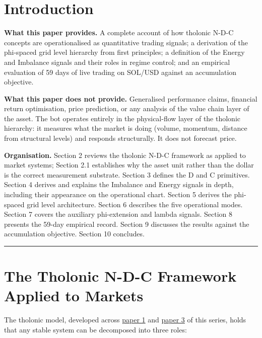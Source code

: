 \documentclass[12pt]{article}
\begin{document}
\section{Introduction}\label{introduction}

\textbf{What this paper provides.} A complete account of how tholonic
N-D-C concepts are operationalised as quantitative trading signals; a
derivation of the phi-spaced grid level hierarchy from first principles;
a definition of the Energy and Imbalance signals and their roles in
regime control; and an empirical evaluation of 59 days of live trading
on SOL/USD against an accumulation objective.

\textbf{What this paper does not provide.} Generalised performance
claims, financial return optimisation, price prediction, or any analysis
of the value chain layer of the asset. The bot operates entirely in the
physical-flow layer of the tholonic hierarchy: it measures what the
market is doing (volume, momentum, distance from structural levels) and
responds structurally. It does not forecast price.

\textbf{Organisation.} Section 2 reviews the tholonic N-D-C framework as
applied to market systems; Section 2.1 establishes why the asset unit
rather than the dollar is the correct measurement substrate. Section 3
defines the D and C primitives. Section 4 derives and explains the
Imbalance and Energy signals in depth, including their appearance on the
operational chart. Section 5 derives the phi-spaced grid level
architecture. Section 6 describes the five operational modes. Section 7
covers the auxiliary phi-extension and lambda signals. Section 8
presents the 59-day empirical record. Section 9 discusses the results
against the accumulation objective. Section 10 concludes.

\begin{center}\rule{0.5\linewidth}{0.5pt}\end{center}

\section{The Tholonic N-D-C Framework Applied to Markets}\label{the-tholonic-n-d-c-framework-applied-to-markets}

The tholonic model, developed across
\href{https://github.com/baardev/truevalue/blob/main/docnav/Research/papers/1_recursive-tholonic-five-constants/1_recursive-tholonic-five-constants.pdf}{paper
1} and
\href{https://github.com/baardev/truevalue/blob/main/docnav/Research/papers/3_minimal-recursive-triadic-framework/3_minimal-recursive-triadic-framework.pdf}{paper
3} of this series, holds that any stable system can be decomposed into
three roles:
\end{document}
